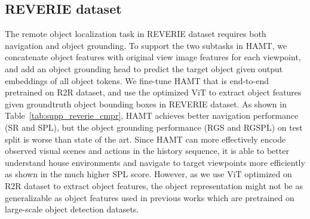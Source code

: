 \subsection{REVERIE dataset}
The remote object localization task in REVERIE dataset requires both navigation and object grounding. To support the two subtasks in HAMT, we concatenate object features with original view image features for each viewpoint, and add an object grounding head to predict the target object given output embeddings of all object tokens.
We fine-tune HAMT that is end-to-end pretrained on R2R dataset, and use the optimized ViT to extract object features given groundtruth object bounding boxes in REVERIE dataset.
As shown in Table~\ref{tab:supp_reverie_cmpr}, HAMT achieves better navigation performance (SR and SPL), but the object grounding performance (RGS and RGSPL) on test split is worse than state of the art. 
Since HAMT can more effectively encode observed visual scenes and actions in the history sequence, it is able to better understand house environments and navigate to target viewpoints more efficiently as shown in the much higher SPL score.
However, as we use ViT optimized on R2R dataset to extract object features, the object representation might not be as generalizable as object features used in previous works which are pretrained on large-scale object detection datasets.


